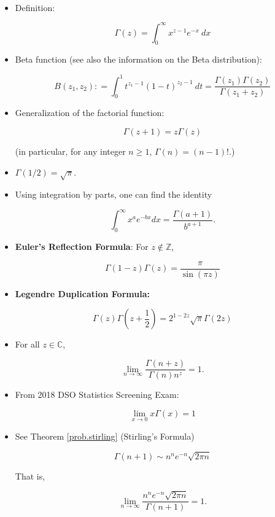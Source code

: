 \begin{proposition}

\

\begin{itemize}

\item Definition:

\[
\Gamma(z) = \int_0^\infty x^{z-1} e^{-x} \ dx
\]

\item Beta function (see also the information on the Beta distribution):

\[
B(z_1, z_2): = \int_0^1 t^{z_1 - 1} (1-t)^{z_2 - 1} \ dt= \frac{ \Gamma(z_1) \Gamma(z_2)}{\Gamma(z_1 + z_2)}
\]

\item Generalization of the factorial function:

\[
\Gamma(z + 1) = z \Gamma(z)
\]

(in particular, for any integer \(n \geq 1\), \(\Gamma(n) = (n-1)!\).)

\item \(\Gamma(1/2) = \sqrt{\pi}\).

\item Using integration by parts, one can find the identity

\[
\int_0^\infty x^a e^{-b x} dx = \frac{\Gamma(a+1)}{b^{a + 1}}.
\]

\item \textbf{Euler's Reflection Formula}: For \(z \notin \mathbb{Z}\),

\[
\Gamma(1-z)\Gamma(z) = \frac{\pi}{\sin(\pi z)}
\]

\item \textbf{Legendre Duplication Formula:}

\[
\Gamma(z) \Gamma \left( z + \frac{1}{2} \right) = 2^{1 - 2z} \sqrt{\pi} \Gamma(2z)
\]

\item For all \(z \in \mathbb{C}\),

\[
\lim_{n \to \infty} \frac{\Gamma(n+z)}{\Gamma(n) n^z} = 1.
\]

\item From 2018 DSO Statistics Screening Exam:

\[
\lim_{x \to 0} x \Gamma(x) = 1
\]

\item See Theorem \ref{prob.stirling} (Stirling's Formula)

\[
\Gamma(n+1) \sim n^ne^{-n} \sqrt{2\pi n}
\]

That is,

\[
\lim_{n \to \infty} \frac {n^ne^{-n} \sqrt{2\pi n}}{\Gamma(n +1)} = 1.
\]

\end{itemize}

\end{proposition}

